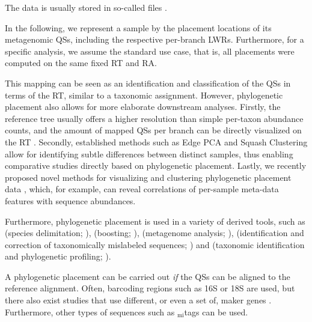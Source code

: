 The data is usually stored in so-called  files \cite{Matsen2012}.

In the following, we represent a sample by the placement locations of its metagenomic \acp{QS},
including the respective per-branch \acp{LWR}.
Furthermore, for a specific analysis, we assume the standard use case,
that is, all placements were computed on the same fixed \acf{RT} and \acl{RA}.


This mapping can be seen as an identification and classification of the \acp{QS} in terms of the \ac{RT},
similar to a taxonomic assignment.
However, phylogenetic placement also allows for more elaborate downstream analyses.
Firstly, the reference tree usually offers a higher resolution than simple per-taxon abundance counts,
and the amount of mapped \acp{QS} per branch can be directly visualized on the \ac{RT} \citep{Mahe2017}.
Secondly, established methods such as Edge PCA and Squash Clustering \citep{Matsen2011a}
allow for identifying subtle differences between distinct samples,
thus enabling comparative studies directly based on phylogenetic placement.
Lastly, we recently proposed novel methods for visualizing and clustering phylogenetic placement data \citep{Czech2018a},
which, for example, can reveal correlations of per-sample meta-data features with sequence abundances.


Furthermore, phylogenetic placement is used in a variety of derived tools,
such as  (species delimitation; \cite{Zhang2013,Kapli2017}),
 (boosting; \cite{Mirarab2012}),
 (metagenome analysis; \cite{Darling2014}),
 (identification and correction of taxonomically mislabeled sequences; \cite{Kozlov2016})
and  (taxonomic identification and phylogenetic profiling; \cite{Nguyen2014}).

A phylogenetic placement can be carried out {\em if} the \acp{QS} can be aligned to the reference alignment.
Often, barcoding regions such as 16S or 18S are used,
but there also exist studies that use different, or even a set of, maker genes \citep{Sunagawa2013a}.
Furthermore, other types of sequences such as $_{\text{mi}}$tags %
\citep{Logares2014} can be used.


